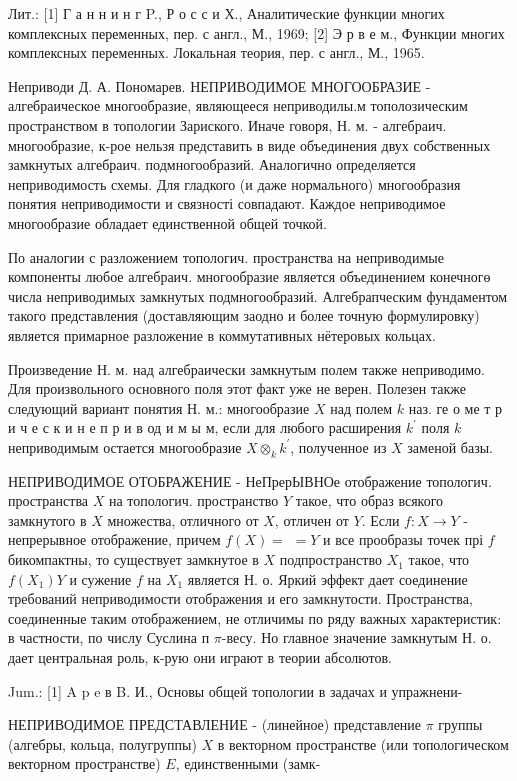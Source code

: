 \documentclass[10pt]{article}
\begin{document}
Лит.: [1] Г а н н и н г P., Р о с с и Х., Аналитические функции многих комплексных переменных, пер. с англ., М., 1969; [2] Э р в е м., Функции многих комплексных переменных. Локальная теория, пер. с англ., М., 1965.



Неприводи Д. А. Пономарев. НЕПРИВОДИМОЕ МНОГООБРАЗИЕ - алгебраическое многообразие, являющееся неприводилы.м тополозическим пространством в топологии Зариского. Иначе говоря, Н. м. - алгебраич. многообразие, к-рое нельзя представить в виде объединения двух собственных замкнутых алгебраич. подмногообразий. Аналогично определяется неприводимость схемы. Для гладкого (и даже нормального) многообразия понятия неприводимости и связності совпадают. Каждое неприводимое многообразие обладает единственной общей точкой.



По аналогии с разложением топологич. пространства на неприводимые компоненты любое алгебраич. многообразие является объединением конечногө числа неприводимых замкнутых подмногообразий. Алгебрапческим фундаментом такого представления (доставляющим заодно и более точную формулировку) является примарное разложение в коммутативных нётеровых кольцах.



Произведение Н. м. над алгебраически замкнутым полем также неприводимо. Для произвольного основного поля этот факт уже не верен. Полезен также следующий вариант понятия Н. м.: многообразие $X$ над полем $k$ наз. ге о ме т р и ч е с к и н е п р и в од и м ы м, если для любого расширения $k^{\prime}$ поля $k$ неприводимым остается многообразие $X \otimes_{k} k^{\prime}$, полученное из $X$ заменой базы.



НЕПРИВОДИМОЕ ОТОБРАЖЕНИЕ - НеПрерЫВНОе отображение топологич. пространства $X$ на топологич. пространство $Y$ такое, что образ всякого замкнутого в $X$ множества, отличного от $X$, отличен от $Y$. Если $f: X \rightarrow Y$ - непрерывное отображение, причем $f(X)=$ $=Y$ и все прообразы точек прі $f$ бикомпактны, то существует замкнутое в $X$ подпространство $X_{1}$ такое, что $f\left(X_{1}\right) Y$ и сужение $f$ на $X_{1}$ является Н. о. Яркий эффект дает соединение требований неприводимости отображения и его замкнутости. Пространства, соединенные таким отображением, не отличимы по ряду важных характеристик: в частности, по числу Суслина п $\pi$-весу. Но главное значение замкнутым Н. о. дает центральная роль, к-рую они играют в теории абсолютов.



Jum.: [1] A p e в B. И., Основы общей топологии в задачах и упражнени-



НЕПРИВОДИМОЕ ПРЕДСТАВЛЕНИЕ - (линейное) представление $\pi$ группы (алгебры, кольца, полугруппы) $X$ в векторном пространстве (или топологическом векторном пространстве) $E$, единственными (замк-
\end{document}
